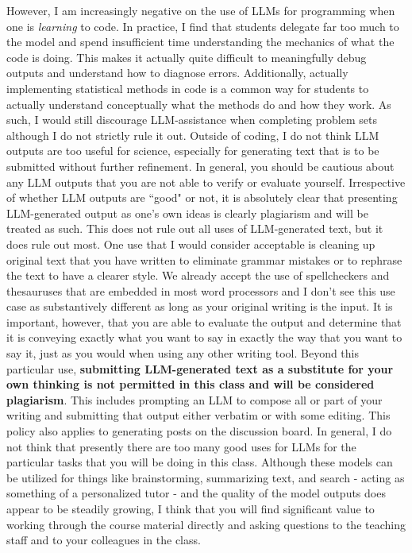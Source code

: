 \documentclass[11pt, article, oneside]{memoir}
\theoremstyle{Assumption}
\begin{document}
\newline\newline
However, I am increasingly negative on the use of LLMs for programming when one is \textit{learning} to code. In practice, I find that students delegate far too much to the model and spend insufficient time understanding the mechanics of what the code is doing. This makes it actually quite difficult to meaningfully debug outputs and understand how to diagnose errors. Additionally, actually implementing statistical methods in code is a common way for students to actually understand conceptually what the methods do and how they work. As such, I would still discourage LLM-assistance when completing problem sets although I do not strictly rule it out.
\newline\newline
Outside of coding, I do not think LLM outputs are too useful for science, especially for generating text that is to be submitted without further refinement. In general, you should be cautious about any LLM outputs that you are not able to verify or evaluate yourself. 
\newline\newline
Irrespective of whether LLM outputs are ``good" or not, it is absolutely clear that presenting LLM-generated output as one's own ideas is clearly plagiarism and will be treated as such. This does not rule out all uses of LLM-generated text, but it does rule out most. One use that I would consider acceptable is cleaning up original text that you have written to eliminate grammar mistakes or to rephrase the text to have a clearer style. We already accept the use of spellcheckers and thesauruses that are embedded in most word processors and I don't see this use case as substantively different as long as your original writing is the input. It is important, however, that you are able to evaluate the output and determine that it is conveying exactly what you want to say in exactly the way that you want to say it, just as you would when using any other writing tool.
\newline\newline
Beyond this particular use, \textbf{submitting LLM-generated text as a substitute for your own thinking is not permitted in this class and will be considered plagiarism}. This includes prompting an LLM to compose all or part of your writing and submitting that output either verbatim or with some editing. This policy also applies to generating posts on the discussion board. 
\newline\newline
In general, I do not think that presently there are too many good uses for LLMs for the particular tasks that you will be doing in this class. Although these models can be utilized for things like brainstorming, summarizing text, and search - acting as something of a personalized tutor - and the quality of the model outputs does appear to be steadily growing, I think that you will find significant value to working through the course material directly and asking questions to the teaching staff and to your colleagues in the class.
\end{document}

